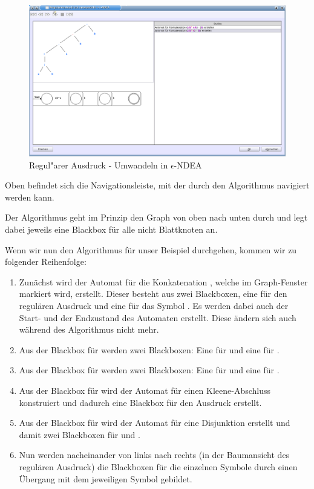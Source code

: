 \begin{figure}[h]
\begin{center}
\includegraphics[width=12cm]{../images/regex_to_enfa.png}
\caption{Regul"arer Ausdruck - Umwandeln in $\epsilon$-NDEA}
\end{center}
\end{figure}

Oben befindet sich die Navigationsleiste, mit der durch den Algorithmus navigiert werden kann.

Der Algorithmus geht im Prinzip den Graph von oben nach unten durch und legt dabei jeweils eine Blackbox für alle nicht Blattknoten an.

Wenn wir nun den Algorithmus für unser Beispiel durchgehen, kommen wir zu folgender Reihenfolge:
\begin{enumerate}
  \item Zunächst wird der Automat für die Konkatenation , welche im Graph-Fenster markiert wird, erstellt. Dieser besteht aus zwei Blackboxen, eine für den regulären Ausdruck  und eine für das Symbol . Es werden dabei auch der Start- und der Endzustand des Automaten erstellt. Diese ändern sich auch während des Algorithmus nicht mehr.
  \item Aus der Blackbox für  werden zwei Blackboxen: Eine für  und eine für .
  \item Aus der Blackbox für  werden zwei Blackboxen: Eine für  und eine für .
  \item Aus der Blackbox für  wird der Automat für einen Kleene-Abschluss konstruiert und dadurch eine Blackbox für den Ausdruck  erstellt.
  \item Aus der Blackbox für  wird der Automat für eine Disjunktion erstellt und damit zwei Blackboxen für  und .
  \item Nun werden nacheinander von links nach rechts (in der Baumansicht des regulären Ausdruck) die Blackboxen für die einzelnen Symbole durch einen Übergang mit dem jeweiligen Symbol gebildet.
\end{enumerate}

